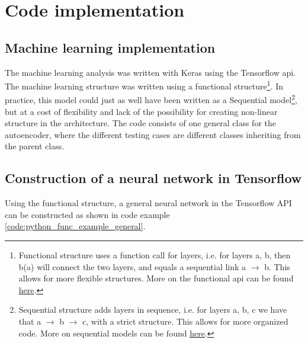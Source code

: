 \section{Code implementation}
\subsection*{Machine learning implementation}

The machine learning analysis was written with Keras\cite{chollet2015keras} using the Tensorflow api\cite{tensorflow-whitepaper}. 
The machine learning structure was written using a functional structure\footnote{Functional structure uses a function call for layers, i.e. for layers a, b, then b(a) will connect the two layers, and equals a sequential link a $\to$ b. This allows for more flexible structures. More on the functional api can be found \href{https://www.tensorflow.org/guide/keras/functional}{here}.}.
In practice, this model could just as well have been written as a Sequential model\footnote{Sequential structure adds layers in sequence, i.e. for layers a, b, c we have that a $\to$ b $\to$ c, with a strict structure. This allows for more organized code. More on sequential models can be found \href{https://www.tensorflow.org/guide/keras/sequential_model}{here}.}, 
but at a cost of flexibility and lack of the possibility for creating non-linear structure in the architecture. The code consists of one general class for
 the autoencoder, where the different testing cases are different classes inheriting from the parent class.
\subsection*{Construction of a neural network in Tensorflow}

Using the functional structure, a general neural network in the Tensorflow API can be constructed as shown in code example \ref{code:python_func_example_general}.

